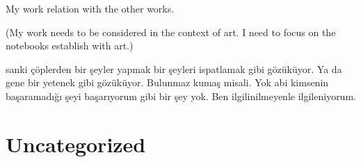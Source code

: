 



My work relation with the other works.

(My work needs to be considered in the context of art. I need to focus on the notebooks establish with art.)

sanki çöplerden bir şeyler yapmak bir şeyleri ispatlamak gibi gözüküyor. Ya da gene bir yetenek gibi gözüküyor. Bulunmaz kumaş misali. Yok abi kimsenin başaramadığı şeyi başarıyorum gibi bir şey yok. Ben ilgilinilmeyenle ilgileniyorum.



\chapter{Uncategorized}


%
%
%








